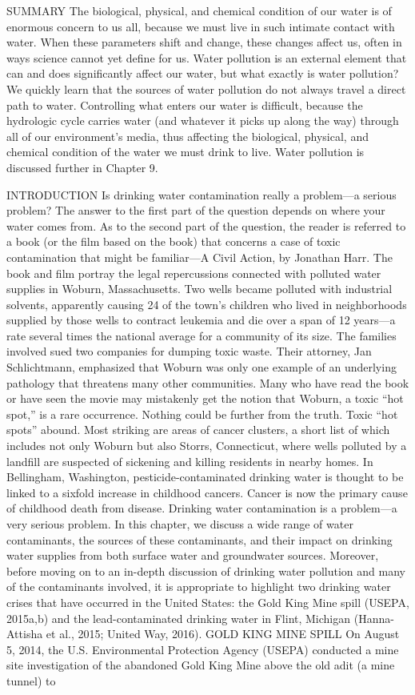 \documentclass{article}
\begin{document}
SUMMARY The biological, physical, and chemical condition of our water is
of enormous concern to us all, because we must live in such intimate
contact with water. When these parameters shift and change, these
changes affect us, often in ways science cannot yet define for us. Water
pollution is an external element that can and does significantly affect
our water, but what exactly is water pollution? We quickly learn that
the sources of water pollution do not always travel a direct path to
water. Controlling what enters our water is difficult, because the
hydrologic cycle carries water (and whatever it picks up along the way)
through all of our environment's media, thus affecting the biological,
physical, and chemical condition of the water we must drink to live.
Water pollution is discussed further in Chapter 9.

INTRODUCTION Is drinking water contamination really a problem---a
serious problem? The answer to the first part of the question depends on
where your water comes from. As to the second part of the question, the
reader is referred to a book (or the film based on the book) that
concerns a case of toxic contamination that might be familiar---A Civil
Action, by Jonathan Harr. The book and film portray the legal
repercussions connected with polluted water supplies in Woburn,
Massachusetts. Two wells became polluted with industrial solvents,
apparently causing 24 of the town's children who lived in neighborhoods
supplied by those wells to contract leukemia and die over a span of 12
years---a rate several times the national average for a community of its
size. The families involved sued two companies for dumping toxic waste.
Their attorney, Jan Schlichtmann, emphasized that Woburn was only one
example of an underlying pathology that threatens many other
communities. Many who have read the book or have seen the movie may
mistakenly get the notion that Woburn, a toxic ``hot spot,'' is a rare
occurrence. Nothing could be further from the truth. Toxic ``hot spots''
abound. Most striking are areas of cancer clusters, a short list of
which includes not only Woburn but also Storrs, Connecticut, where wells
polluted by a landfill are suspected of sickening and killing residents
in nearby homes. In Bellingham, Washington, pesticide-contaminated
drinking water is thought to be linked to a sixfold increase in
childhood cancers. Cancer is now the primary cause of childhood death
from disease. Drinking water contamination is a problem---a very serious
problem. In this chapter, we discuss a wide range of water contaminants,
the sources of these contaminants, and their impact on drinking water
supplies from both surface water and groundwater sources. Moreover,
before moving on to an in-depth discussion of drinking water pollution
and many of the contaminants involved, it is appropriate to highlight
two drinking water crises that have occurred in the United States: the
Gold King Mine spill (USEPA, 2015a,b) and the lead-contaminated drinking
water in Flint, Michigan (Hanna-Attisha et al., 2015; United Way, 2016).
GOLD KING MINE SPILL On August 5, 2014, the U.S. Environmental
Protection Agency (USEPA) conducted a mine site investigation of the
abandoned Gold King Mine above the old adit (a mine tunnel) to
\end{document}
